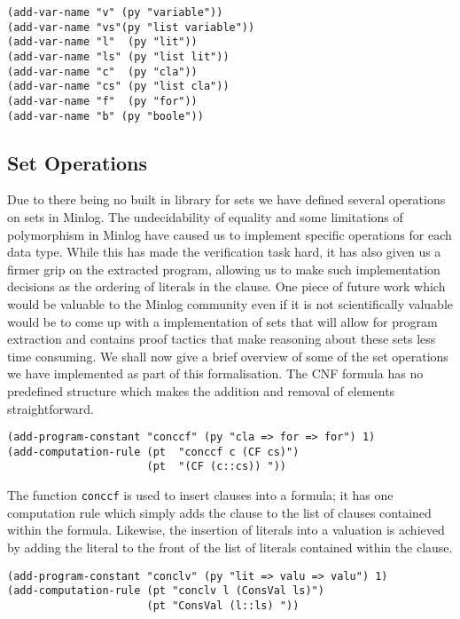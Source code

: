 \begin{lstlisting}[caption = "Variable namings for the DPLL formalisation in Minlog"]
(add-var-name "v" (py "variable"))
(add-var-name "vs"(py "list variable"))
(add-var-name "l"  (py "lit"))
(add-var-name "ls" (py "list lit"))
(add-var-name "c"  (py "cla"))
(add-var-name "cs" (py "list cla"))
(add-var-name "f"  (py "for"))
(add-var-name "b" (py "boole"))
\end{lstlisting}

\subsection*{Set Operations}
Due to there being no built in library for sets we have defined several operations on sets in Minlog. The  undecidability of equality and some limitations of polymorphism in Minlog have caused us to implement specific operations for each data type. While this has made the verification task hard, it has also given us a firmer grip on the extracted program, allowing us to make such implementation decisions as the ordering of literals in the clause. One piece of future work which would be valuable to the Minlog community even if it is not scientifically valuable would be to come up with a implementation of sets that will allow for program extraction and contains proof tactics that make reasoning about these sets less time consuming. We shall now give a brief overview of some of the set operations we have implemented as part of this formalisation. The CNF formula has no predefined structure which makes the addition and removal of elements straightforward.

\begin{lstlisting}[caption = "Code for the addition and removal of clauses from formulae"]
(add-program-constant "conccf" (py "cla => for => for") 1)
(add-computation-rule (pt  "conccf c (CF cs)")
                      (pt  "(CF (c::cs)) "))
\end{lstlisting}

The function \texttt{conccf} is used to insert clauses into a formula; it has one computation rule which simply adds the clause to the list of clauses contained within the formula. Likewise, the insertion of literals into a valuation is achieved by adding the literal to the front of the list of literals contained within the clause.

\begin{lstlisting}[caption = "The Function for the addition of a literal to a valuation"]
(add-program-constant "conclv" (py "lit => valu => valu") 1)
(add-computation-rule (pt "conclv l (ConsVal ls)")
                      (pt "ConsVal (l::ls) "))
\end{lstlisting}



